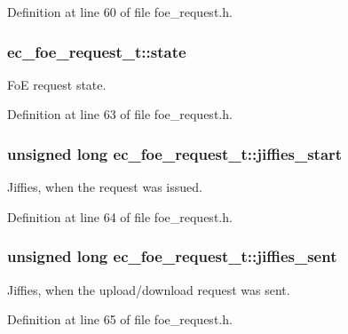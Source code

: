 Definition at line 60 of file foe\-\_\-request.\-h.

\subsubsection[{state}]{ ec\-\_\-foe\-\_\-request\-\_\-t\-::state}\label{structec__foe__request__t_afd59d6b4eb03fe6f05a20179cef9ac5e}


Fo\-E request state. 



Definition at line 63 of file foe\-\_\-request.\-h.

\subsubsection[{jiffies\-\_\-start}]{\setlength{\rightskip}{0pt plus 5cm}unsigned long ec\-\_\-foe\-\_\-request\-\_\-t\-::jiffies\-\_\-start}\label{structec__foe__request__t_a3fef682f7dcd197e1fa74cf90a2e8963}


Jiffies, when the request was issued. 



Definition at line 64 of file foe\-\_\-request.\-h.

\subsubsection[{jiffies\-\_\-sent}]{\setlength{\rightskip}{0pt plus 5cm}unsigned long ec\-\_\-foe\-\_\-request\-\_\-t\-::jiffies\-\_\-sent}\label{structec__foe__request__t_ac0d7533c6fc99ddf0a4584837a2829d3}


Jiffies, when the upload/download request was sent. 



Definition at line 65 of file foe\-\_\-request.\-h.

